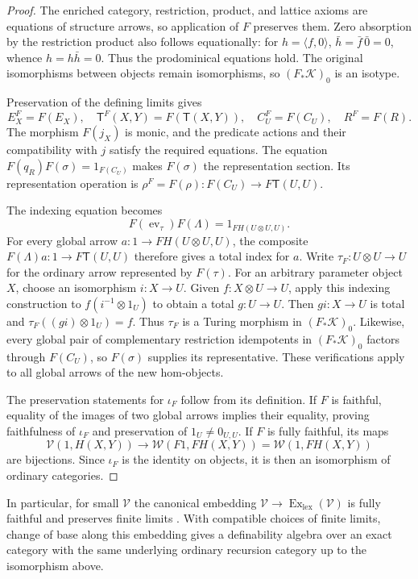 \documentclass[11pt]{article}
\theoremstyle{definition}
\theoremstyle{remark}
\begin{document}
\begin{proof}
The enriched category, restriction, product, and lattice axioms
are equations of structure arrows, so application of $F$ preserves
them. Zero absorption by the restriction product also follows
equationally: for $h=\langle f,0\rangle$,
$\bar h=\bar f\,\bar0=0$, whence $h=h\bar h=0$.
Thus the prodominical equations hold. The original isomorphisms
between objects remain isomorphisms, so $(F_*\mathcal K)_0$ is an isotype.

Preservation of the defining limits gives
\[
 E_X^{F}=F(E_X),\quad
 \mathsf T^{F}(X,Y)=F(\mathsf T(X,Y)),\quad
 C_U^{F}=F(C_U),\quad R^{F}=F(R).
\]
The morphism $F(j_X)$ is monic, and the predicate actions and their
compatibility with $j$ satisfy the required equations. The equation
$F(q_R)F(\sigma)=1_{F(C_U)}$ makes $F(\sigma)$ the representation
section. Its representation operation is
$\rho^F=F(\rho):F(C_U)\longrightarrow F\mathsf T(U,U)$.

The indexing equation becomes
\[
 F(\operatorname{ev}_{\tau})F(\Lambda)
     =1_{FH(U\otimes U,U)}.
\]
For every global arrow $a:1\to FH(U\otimes U,U)$, the composite
$F(\Lambda)a:1\to F\mathsf T(U,U)$ therefore gives a total index
for $a$. Write $\tau_F:U\otimes U\to U$ for the ordinary arrow
represented by $F(\tau)$. For an arbitrary parameter object $X$,
choose an isomorphism $i:X\to U$. Given $f:X\otimes U\to U$,
apply this indexing construction to $f(i^{-1}\otimes1_U)$ to
obtain a total $g:U\to U$. Then $gi:X\to U$ is total and
$\tau_F((gi)\otimes1_U)=f$. Thus $\tau_F$ is a Turing morphism
in $(F_*\mathcal K)_0$.
Likewise, every global pair of complementary restriction idempotents in
$(F_*\mathcal K)_0$ factors through $F(C_U)$, so $F(\sigma)$ supplies
its representative. These verifications apply to all global
arrows of the new hom-objects.

The preservation statements for $\iota_F$ follow from its
definition. If $F$ is faithful, equality of the images of two
global arrows implies their equality, proving faithfulness of
$\iota_F$ and preservation of $1_U\ne0_{U,U}$. If $F$ is fully
faithful, its maps
\[
 \mathscr V(1,H(X,Y))\longrightarrow
 \mathscr W(F1,FH(X,Y))=\mathscr W(1,FH(X,Y))
\]
are bijections. Since $\iota_F$ is the identity on objects, it is
then an isomorphism of ordinary categories.
\end{proof}

In particular, for small $\mathscr V$ the canonical embedding
$\mathscr V\to\operatorname{Ex}_{\mathrm{lex}}(\mathscr V)$ is
fully faithful and preserves finite limits
\cite[Section~2]{CarboniCeliaMagno1982}. With compatible choices
of finite limits, change of base along this embedding gives a
definability algebra over an exact category with the same underlying
ordinary recursion category up to the isomorphism above.
\end{document}
